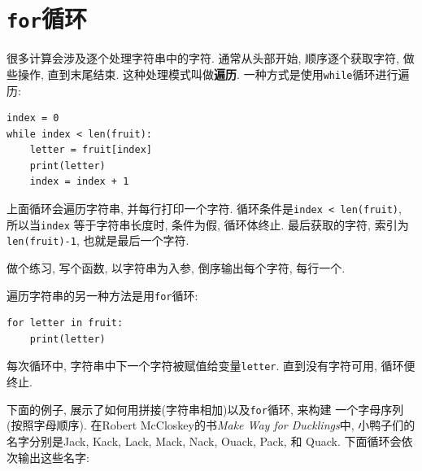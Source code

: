 \documentclass[10pt]{book}
\begin{document}
\section{{\tt for}循环}
\label{for}
很多计算会涉及逐个处理字符串中的字符. 
通常从头部开始, 顺序逐个获取字符, 做些操作, 直到末尾结束. 
这种处理模式叫做{\bf 遍历}.
一种方式是使用{\tt while}循环进行遍历:

\begin{verbatim}
index = 0
while index < len(fruit):
    letter = fruit[index]
    print(letter)
    index = index + 1
\end{verbatim}
%
上面循环会遍历字符串, 并每行打印一个字符. 
循环条件是{\tt index < len(fruit)}, 
所以当{\tt index} 等于字符串长度时, 条件为假, 循环体终止. 
最后获取的字符, 索引为{\tt len(fruit)-1}, 也就是最后一个字符. 

做个练习, 写个函数, 以字符串为入参, 倒序输出每个字符, 每行一个. 

遍历字符串的另一种方法是用{\tt for}循环:

\begin{verbatim}
for letter in fruit:
    print(letter)
\end{verbatim}
%
每次循环中, 字符串中下一个字符被赋值给变量{\tt letter}. 
直到没有字符可用, 循环便终止. 

下面的例子, 展示了如何用拼接(字符串相加)以及{\tt for}循环, 来构建
一个字母序列(按照字母顺序). 
在Robert McCloskey的书{\em Make Way for Ducklings}中, 
小鸭子们的名字分别是Jack, Kack, Lack,
Mack, Nack, Ouack, Pack, 和 Quack.
下面循环会依次输出这些名字:
\end{document}

